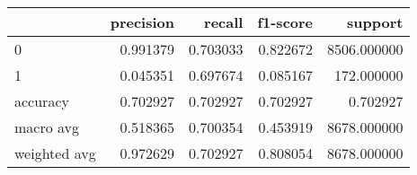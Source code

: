 \begin{tabular}{lrrrr}
\toprule
{} &  precision &    recall &  f1-score &      support \\
\midrule
0            &   0.991379 &  0.703033 &  0.822672 &  8506.000000 \\
1            &   0.045351 &  0.697674 &  0.085167 &   172.000000 \\
accuracy     &   0.702927 &  0.702927 &  0.702927 &     0.702927 \\
macro avg    &   0.518365 &  0.700354 &  0.453919 &  8678.000000 \\
weighted avg &   0.972629 &  0.702927 &  0.808054 &  8678.000000 \\
\bottomrule
\end{tabular}
